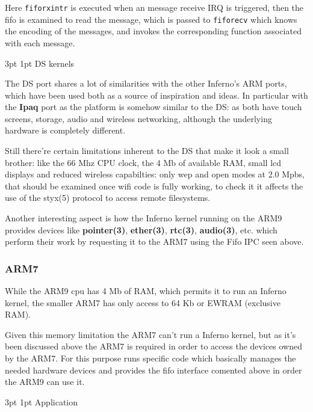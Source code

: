 \documentclass[11pt]{p9article}
\makeatletter
\renewcommand\subsection{\@startsection {subsection}{1}{\z@} {3pt}
{1pt} {\normalfont\normalsize\bfseries}}
\makeatother
\begin{document}
Here \verb+fiforxintr+ is executed when an message receive IRQ is triggered,
then the fifo is examined to read the message, which is passed to \verb+fiforecv+
which knows the encoding of the messages, and invokes the corresponding
function associated with each message.

\subsection{DS kernels}

The DS port shares a lot of similarities with the other Inferno's ARM ports,
which have been used both as a source of inspiration and ideas.
In particular with the \textbf{Ipaq} port as the platform is somehow similar to the DS:
as both have touch screens, storage, audio and wireless networking,
although the underlying hardware is completely different.

Still there're certain limitations inherent to the DS that make it look a small brother:
like the 66 Mhz CPU clock, the 4 Mb of available RAM, small lcd displays and reduced wireless capabilties: only wep and open modes at 2.0 Mpbs, that should be examined once wifi code is fully working, to check it it affects the use of the styx(5) protocol to access remote filesystems.

Another interesting aspect is how the Inferno kernel running on the ARM9
provides devices like \textbf{pointer(3)}, \textbf{ether(3)}, \textbf{rtc(3)}, \textbf{audio(3)}, etc. 
which perform their work by requesting it to the ARM7 using the Fifo IPC seen above.

\subsubsection{ARM7}
While the ARM9 cpu has 4 Mb of RAM, which permits it to run an Inferno kernel,
the smaller ARM7 has only access to 64 Kb or EWRAM (exclusive RAM).

Given this memory limitation the ARM7 can't run a Inferno kernel,
but as it's been discussed above the ARM7 is required in order to access
the devices owned by the ARM7.
For this purpose runs specific code which basically manages the needed hardware devices
and provides the fifo interface comented above in order the ARM9 can use it.

\subsection{Application}
\end{document}
